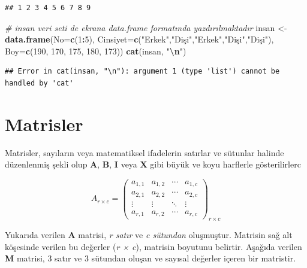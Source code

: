 \documentclass[
]{book}
\newenvironment{Shaded}{\begin{snugshade}}{\end{snugshade}}
\newcommand{\AttributeTok}[1]{\textcolor[rgb]{0.13,0.29,0.53}{#1}}
\newcommand{\CommentTok}[1]{\textcolor[rgb]{0.56,0.35,0.01}{\textit{#1}}}
\newcommand{\DecValTok}[1]{\textcolor[rgb]{0.00,0.00,0.81}{#1}}
\newcommand{\FunctionTok}[1]{\textcolor[rgb]{0.13,0.29,0.53}{\textbf{#1}}}
\newcommand{\NormalTok}[1]{#1}
\newcommand{\OtherTok}[1]{\textcolor[rgb]{0.56,0.35,0.01}{#1}}
\newcommand{\SpecialCharTok}[1]{\textcolor[rgb]{0.81,0.36,0.00}{\textbf{#1}}}
\newcommand{\StringTok}[1]{\textcolor[rgb]{0.31,0.60,0.02}{#1}}
\begin{document}
\begin{verbatim}
## 1 2 3 4 5 6 7 8 9
\end{verbatim}

\begin{Shaded}
\begin{Highlighting}[]
\CommentTok{\# insan veri seti de ekrana data.frame formatında yazdırılmaktadır}
\NormalTok{insan }\OtherTok{\textless{}{-}} \FunctionTok{data.frame}\NormalTok{(}\AttributeTok{No=}\FunctionTok{c}\NormalTok{(}\DecValTok{1}\SpecialCharTok{:}\DecValTok{5}\NormalTok{), }
                    \AttributeTok{Cinsiyet=}\FunctionTok{c}\NormalTok{(}\StringTok{"Erkek"}\NormalTok{,}\StringTok{"Dişi"}\NormalTok{,}\StringTok{"Erkek"}\NormalTok{,}\StringTok{"Dişi"}\NormalTok{,}\StringTok{"Dişi"}\NormalTok{),}
                    \AttributeTok{Boy=}\FunctionTok{c}\NormalTok{(}\DecValTok{190}\NormalTok{, }\DecValTok{170}\NormalTok{, }\DecValTok{175}\NormalTok{, }\DecValTok{180}\NormalTok{, }\DecValTok{173}\NormalTok{))}
\FunctionTok{cat}\NormalTok{(insan, }\StringTok{"}\SpecialCharTok{\textbackslash{}n}\StringTok{"}\NormalTok{)}
\end{Highlighting}
\end{Shaded}

\begin{verbatim}
## Error in cat(insan, "\n"): argument 1 (type 'list') cannot be handled by 'cat'
\end{verbatim}

\chapter{Matrisler}\label{matrisler-1}

Matrisler, sayıların veya matematiksel ifadelerin satırlar ve sütunlar halinde düzenlenmiş şekli olup \textbf{A}, \textbf{B}, \textbf{I} veya \textbf{X} gibi büyük ve koyu harflerle gösterilirlerc

\[A_{r×c} =
 \begin{pmatrix}
  a_{1,1} & a_{1,2} & \cdots & a_{1,c} \\
  a_{2,1} & a_{2,2} & \cdots & a_{2,c} \\
  \vdots  & \vdots  & \ddots & \vdots  \\
  a_{r,1} & a_{r,2} & \cdots & a_{r,c}
 \end{pmatrix}_{r × c}\]

Yukarıda verilen \textbf{A} matrisi, \emph{r satır} ve \emph{c sütundan} oluşmuştur. Matrisin sağ alt köşesinde verilen bu değerler (\emph{r × c}), matrisin boyutunu belirtir. Aşağıda verilen \textbf{M} matrisi, 3 satır ve 3 sütundan oluşan ve sayısal değerler içeren bir matristir.
\end{document}
